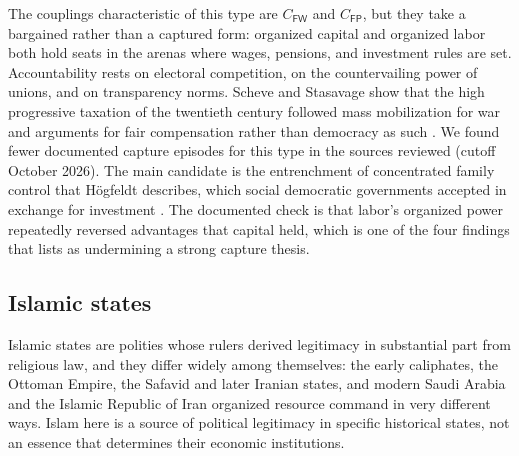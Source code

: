 \documentclass[11pt,letterpaper]{article}
\theoremstyle{definition}
\theoremstyle{remark}
\newcommand{\pF}{\mathsf{F}}
\newcommand{\pP}{\mathsf{P}}
\newcommand{\pW}{\mathsf{W}}
\begin{document}
The couplings characteristic of this type are $C_{\pF\pW}$ and $C_{\pF\pP}$, but they take a bargained rather than a captured form: organized capital and organized labor both hold seats in the arenas where wages, pensions, and investment rules are set. Accountability rests on electoral competition, on the countervailing power of unions, and on transparency norms. Scheve and Stasavage show that the high progressive taxation of the twentieth century followed mass mobilization for war and arguments for fair compensation rather than democracy as such \citep{scheve2016}. We found fewer documented capture episodes for this type in the sources reviewed (cutoff October 2026). The main candidate is the entrenchment of concentrated family control that H\"ogfeldt describes, which social democratic governments accepted in exchange for investment \citep{hogfeldt2005}. The documented check is that labor's organized power repeatedly reversed advantages that capital held, which is one of the four findings that \citet{largo2026hbs} lists as undermining a strong capture thesis.

\subsection{Islamic states}

Islamic states are polities whose rulers derived legitimacy in substantial part from religious law, and they differ widely among themselves: the early caliphates, the Ottoman Empire, the Safavid and later Iranian states, and modern Saudi Arabia and the Islamic Republic of Iran organized resource command in very different ways. Islam here is a source of political legitimacy in specific historical states, not an essence that determines their economic institutions.
\end{document}
